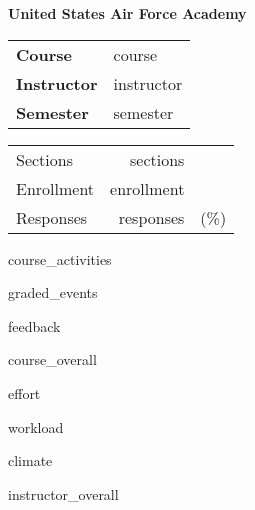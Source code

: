 \documentclass{article}
\begin{document}
{\bfseries\large United States Air Force Academy}

\smallskip  %
\begin{minipage}{0.67\linewidth}
  \begin{tabular}{@{}>{\bfseries}ll}
    Course & {{ course }}\\
    Instructor & {{ instructor }}\\
    Semester & {{ semester }}\\
  \end{tabular}
\end{minipage}%
\begin{minipage}{0.33\linewidth}
  \hfill  %
  \begin{tabular}{l rr@{}}
    Sections & {{ sections }}\\
    Enrollment & {{ enrollment }}\\
    Responses & {{ responses }} & (\%)\\
  \end{tabular}
\end{minipage}
\medskip  %

{{ course_activities }}

{{ graded_events }}

{{ feedback }}

{{ course_overall }}

{{ effort }}

\clearpage  %
{{ workload }}

{{ climate }}

{{ instructor_overall }}

\end{document}
